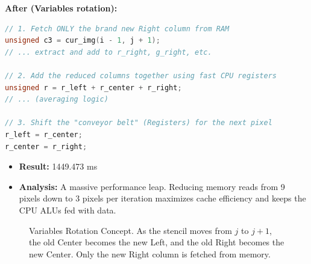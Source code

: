 \documentclass[11pt,a4paper]{article}
\begin{document}
\textbf{After (Variables rotation):}
\begin{lstlisting}[language=C]
// 1. Fetch ONLY the brand new Right column from RAM
unsigned c3 = cur_img(i - 1, j + 1); 
// ... extract and add to r_right, g_right, etc.

// 2. Add the reduced columns together using fast CPU registers
unsigned r = r_left + r_center + r_right; 
// ... (averaging logic)

// 3. Shift the "conveyor belt" (Registers) for the next pixel
r_left = r_center;
r_center = r_right;
\end{lstlisting}

\begin{itemize}
    \item \textbf{Result:} 1449.473 ms
    \item \textbf{Analysis:} A massive performance leap. Reducing memory reads from 9 pixels down to 3 pixels per iteration maximizes cache efficiency and keeps the CPU ALUs fed with data.
\end{itemize}

\begin{figure}[H]
\centering
{}
\caption{Variables Rotation Concept. As the stencil moves from $j$ to $j+1$, the old Center becomes the new Left, and the old Right becomes the new Center. Only the new Right column is fetched from memory.}
\end{figure}
\end{document}
